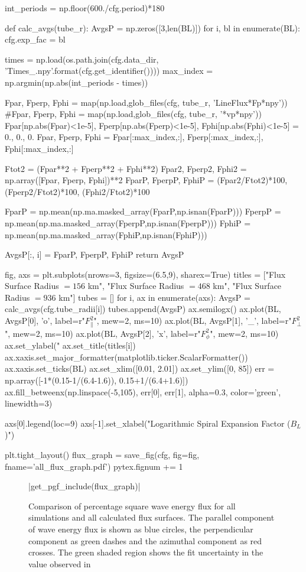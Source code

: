 \begin{pycode}[chapter5]
int_periods = np.floor(600./cfg.period)*180

def calc_avgs(tube_r):
    AvgsP = np.zeros([3,len(BL)])
    for i, bl in enumerate(BL):
        cfg.exp_fac = bl
        
        times = np.load(os.path.join(cfg.data_dir, 'Times_{}.npy'.format(cfg.get_identifier())))
        max_index = np.argmin(np.abs(int_periods - times))
        
        Fpar, Fperp, Fphi = map(np.load,glob_files(cfg, tube_r, 'LineFlux*Fp*npy'))
        #Fpar, Fperp, Fphi = map(np.load,glob_files(cfg, tube_r, '*vp*npy'))
        Fpar[np.abs(Fpar)<1e-5], Fperp[np.abs(Fperp)<1e-5], Fphi[np.abs(Fphi)<1e-5] = 0., 0., 0.
        Fpar, Fperp, Fphi = Fpar[:max_index,:], Fperp[:max_index,:], Fphi[:max_index,:]
        
        Ftot2 = (Fpar**2 + Fperp**2 + Fphi**2)
        Fpar2, Fperp2, Fphi2 = np.array([Fpar, Fperp, Fphi])**2
        FparP, FperpP, FphiP = (Fpar2/Ftot2)*100, (Fperp2/Ftot2)*100, (Fphi2/Ftot2)*100
        
        FparP = np.mean(np.ma.masked_array(FparP,np.isnan(FparP)))
        FperpP = np.mean(np.ma.masked_array(FperpP,np.isnan(FperpP)))
        FphiP = np.mean(np.ma.masked_array(FphiP,np.isnan(FphiP)))
        
        AvgsP[:, i] = FparP, FperpP, FphiP
    return AvgsP

fig, axs = plt.subplots(nrows=3, figsize=(6.5,9), sharex=True)
titles = ["Flux Surface Radius $=156$ km", "Flux Surface Radius $=468$ km", "Flux Surface Radius $=936$ km"]
tubes = []
for i, ax in enumerate(axs):
    AvgsP = calc_avgs(cfg.tube_radii[i])
    tubes.append(AvgsP)
    ax.semilogx()
    ax.plot(BL, AvgsP[0], 'o', label=r"$F_\parallel^2$", mew=2, ms=10)
    ax.plot(BL, AvgsP[1], '_', label=r"$F_\perp^2$", mew=2, ms=10)
    ax.plot(BL, AvgsP[2], 'x', label=r"$F_\phi^2$", mew=2, ms=10)
    ax.set_ylabel("%
    ax.set_title(titles[i])
    ax.xaxis.set_major_formatter(matplotlib.ticker.ScalarFormatter())
    ax.xaxis.set_ticks(BL)
    ax.set_xlim([0.01, 2.01])
    ax.set_ylim([0, 85])
    err = np.array([-1*(0.15-1/(6.4-1.6)), 0.15+1/(6.4+1.6)])
    ax.fill_betweenx(np.linspace(-5,105), err[0], err[1], alpha=0.3, color='green', linewidth=3)

axs[0].legend(loc=9)
axs[-1].set_xlabel("Logarithmic Spiral Expansion Factor ($B_L$)")

plt.tight_layout()
flux_graph = save_fig(cfg, fig=fig, fname='all_flux_graph.pdf')
pytex.fignum += 1
\end{pycode}

\begin{figure}
    \py[chapter5]|get_pgf_include(flux_graph)|
    \caption{Comparison of percentage square wave energy flux for all simulations and all calculated flux surfaces.
        The parallel component of wave energy flux is shown as blue circles, the perpendicular component as green dashes and the azimuthal component as red crosses.
        The green shaded region shows the fit uncertainty in the value observed in \citet{bonet2008}}
    \label{fig:flux_comparison_expfac}
\end{figure}